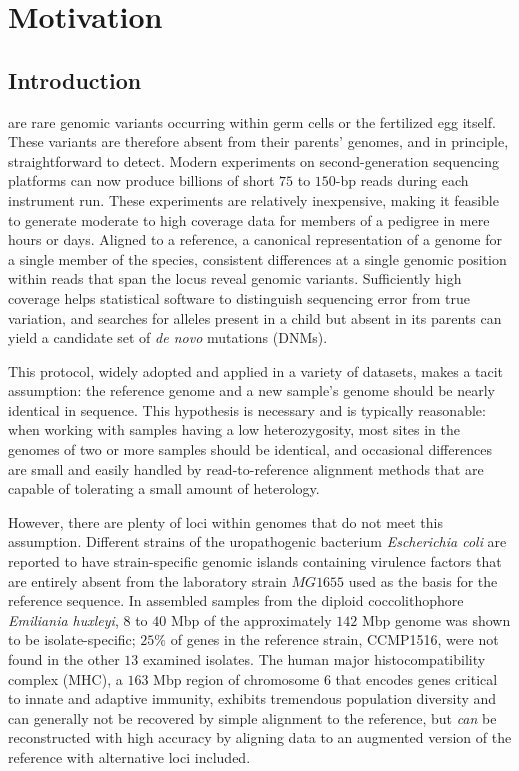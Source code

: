 \chapter{Motivation}
\label{ch:motivation}

\section{Introduction}

 are rare genomic variants occurring within germ cells or the fertilized egg itself.  These variants are therefore absent from their parents' genomes, and in principle, straightforward to detect.  Modern experiments on second-generation sequencing platforms can now produce billions of short $75$ to $150$-bp reads during each instrument run.  These experiments are relatively inexpensive, making it feasible to generate moderate to high coverage data for members of a pedigree in mere hours or days.  Aligned to a reference, a canonical representation of a genome for a single member of the species, consistent differences at a single genomic position within reads that span the locus reveal genomic variants.  Sufficiently high coverage helps statistical software to distinguish sequencing error from true variation, and searches for alleles present in a child but absent in its parents can yield a candidate set of \textit{de novo} mutations (DNMs).

This protocol, widely adopted and applied in a variety of datasets, makes a tacit assumption: the reference genome and a new sample's genome should be nearly identical in sequence.  This hypothesis is necessary and is typically reasonable: when working with samples having a low heterozygosity, most sites in the genomes of two or more samples should be identical, and occasional differences are small and easily handled by read-to-reference alignment methods that are capable of tolerating a small amount of heterology.

However, there are plenty of loci within genomes that do not meet this assumption.  Different strains of the uropathogenic bacterium \textit{Escherichia coli} are reported to have strain-specific genomic islands containing virulence factors that are entirely absent from the laboratory strain $MG1655$ used as the basis for the reference sequence\cite{Fukiya:2004cn}.  In assembled samples from the diploid coccolithophore \textit{Emiliania huxleyi}, $8$ to $40$ Mbp of the approximately $142$ Mbp genome was shown to be isolate-specific; $25\%$ of genes in the reference strain, CCMP1516, were not found in the other $13$ examined isolates\cite{Read:2013bf}.  The human major histocompatibility complex (MHC), a $163$ Mbp region of chromosome $6$ that encodes genes critical to innate and adaptive immunity\cite{Mungall:2003br,Shiina:2009iy}, exhibits tremendous population diversity\cite{GonzalezGalarza:2014cd} and can generally not be recovered by simple alignment to the reference, but \textit{can} be reconstructed with high accuracy by aligning data to an augmented version of the reference with alternative loci included\cite{Dilthey:2015dq}.

